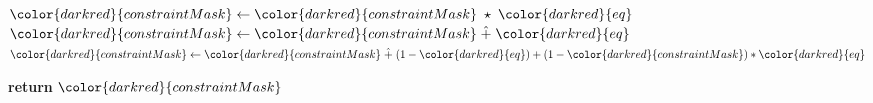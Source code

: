 \begin{algorithm}[H]
\begin{algorithmic}[1]
            \State ${\color{darkred}{constraintMask}} \gets {\color{darkred}{constraintMask}} \hmul {\color{darkred}{eq}}$ 
            \State ${\color{darkred}{constraintMask}} \gets {\color{darkred}{constraintMask}} \hplus {\color{darkred}{eq}}$
            \State ${\color{darkred}{constraintMask}} \gets {\color{darkred}{constraintMask}} \hplus (1-{\color{darkred}{eq}}) + (1-{\color{darkred}{constraintMask}}) * {\color{darkred}{eq}}$
        \EndIf

    \EndFor

    \State \textbf{return} {${\color{darkred}{constraintMask}}$}
\EndProcedure

\end{algorithmic}
\end{algorithm}


